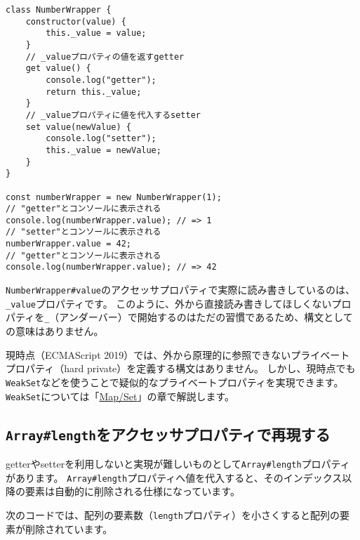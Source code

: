 \begin{lstlisting}
class NumberWrapper {
    constructor(value) {
        this._value = value;
    }
    // _valueプロパティの値を返すgetter
    get value() {
        console.log("getter");
        return this._value;
    }
    // _valueプロパティに値を代入するsetter
    set value(newValue) {
        console.log("setter");
        this._value = newValue;
    }
}

const numberWrapper = new NumberWrapper(1);
// "getter"とコンソールに表示される
console.log(numberWrapper.value); // => 1
// "setter"とコンソールに表示される
numberWrapper.value = 42;
// "getter"とコンソールに表示される
console.log(numberWrapper.value); // => 42
\end{lstlisting}

\begin{tcolorbox}[title=プライベートプロパティ]\label{private-property}

\texttt{NumberWrapper\#value}のアクセッサプロパティで実際に読み書きしているのは、\texttt{\_value}プロパティです。
このように、外から直接読み書きしてほしくないプロパティを\texttt{\_}（アンダーバー）で開始するのはただの習慣であるため、構文としての意味はありません。

現時点（ECMAScript 2019）では、外から原理的に参照できないプライベートプロパティ（hard
private）を定義する構文はありません。
しかし、現時点でも\texttt{WeakSet}などを使うことで疑似的なプライベートプロパティを実現できます。
\texttt{WeakSet}については「\hyperlink{map-and-set}{Map/Set}」の章で解説します。
\end{tcolorbox}

\hypertarget{array-like-length}{%
\subsection{\texorpdfstring{\texttt{Array\#length}をアクセッサプロパティで再現する}{Array\#lengthをアクセッサプロパティで再現する}}\label{array-like-length}}

getterやsetterを利用しないと実現が難しいものとして\texttt{Array\#length}プロパティがあります。
\texttt{Array\#length}プロパティへ値を代入すると、そのインデックス以降の要素は自動的に削除される仕様になっています。

次のコードでは、配列の要素数（\texttt{length}プロパティ）を小さくすると配列の要素が削除されています。

